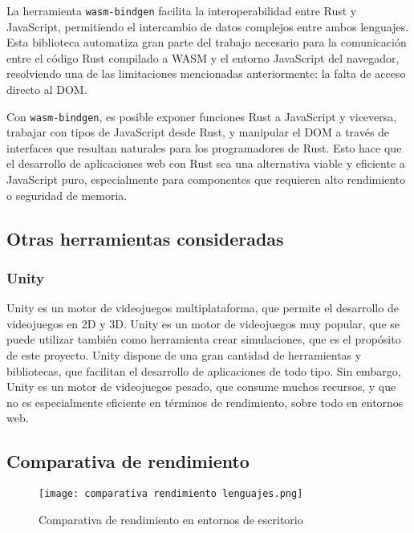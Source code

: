 La herramienta \texttt{wasm-bindgen} \autocite{IntroductionWasmbindgenGuide} facilita la interoperabilidad entre Rust y JavaScript, permitiendo el intercambio de datos complejos entre ambos lenguajes. Esta biblioteca automatiza gran parte del trabajo necesario para la comunicación entre el código Rust compilado a WASM y el entorno JavaScript del navegador, resolviendo una de las limitaciones mencionadas anteriormente: la falta de acceso directo al DOM.

Con \texttt{wasm-bindgen}, es posible exponer funciones Rust a JavaScript y viceversa, trabajar con tipos de JavaScript desde Rust, y manipular el DOM a través de interfaces que resultan naturales para los programadores de Rust. Esto hace que el desarrollo de aplicaciones web con Rust sea una alternativa viable y eficiente a JavaScript puro, especialmente para componentes que requieren alto rendimiento o seguridad de memoria.

\subsection{Otras herramientas consideradas}
\subsubsection{Unity}
Unity es un motor de videojuegos multiplataforma, que permite el desarrollo de videojuegos en 2D y 3D. Unity es un motor de videojuegos muy popular, que se puede utilizar también como herramienta crear simulaciones, que es el propósito de este proyecto. Unity dispone de una gran cantidad de herramientas y bibliotecas, que facilitan el desarrollo de aplicaciones de todo tipo. Sin embargo, Unity es un motor de videojuegos pesado, que consume muchos recursos, y que no es especialmente eficiente en términos de rendimiento, sobre todo en entornos web.

\subsection{Comparativa de rendimiento}

\begin{figure}[H]
    \centering
    \texttt{[image: comparativa rendimiento lenguajes.png]}
    \caption{Comparativa de rendimiento en entornos de escritorio \autocite{zotero-253}}
    \label{fig:comparativa-rendimiento}
\end{figure}


